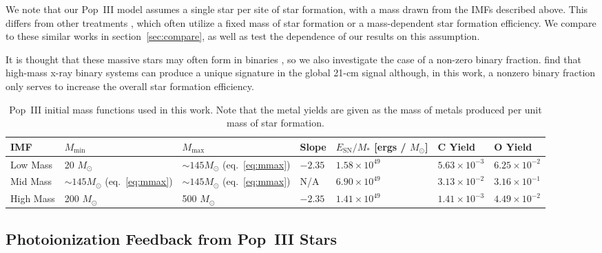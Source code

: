 \documentclass[a4paper,fleqn,usenatbib]{mnras}
\begin{document}
We note that our Pop~III model assumes a single star per site of star formation, with a mass drawn from the IMFs described above. This differs from other treatments \citep[e.g.,][]{jaacks_2017, visbal_2017}, which often utilize a fixed mass of star formation or a mass-dependent star formation efficiency. We compare to these similar works in section~\ref{sec:compare}, as well as test the dependence of our results on this assumption.

It is thought that these massive stars may often form in binaries \citep{turk_2009}, so we also investigate the case of a non-zero binary fraction. \citet{mirocha_2017} find that high-mass x-ray binary systems can produce a unique signature in the global 21-cm signal although, in this work, a nonzero binary fraction only serves to increase the overall star formation efficiency.

\begin{table*}
 \caption{Pop~III initial mass functions used in this work. Note that the metal yields are given as the mass of metals produced per unit mass of star formation.}
 \label{tab:popIII}
 \begin{tabular}{lllllll}
  \hline
  IMF & $M_\text{min}$ & $M_\text{max}$ & Slope & $E_\text{SN} / M_\ast$ [ergs / $M_\odot$] & C Yield & O Yield\\
  \hline
  Low Mass & 20 $M_\odot$ & $\sim 145 M_\odot$ (eq.~\ref{eq:mmax}) & $-2.35$ & $1.58 \times 10^{49}$ & $5.63 \times 10^{-3}$ &$6.25 \times 10^{-2}$\\[2pt] %
  Mid Mass & $\sim 145 M_\odot$ (eq.~\ref{eq:mmax}) & $\sim 145 M_\odot$ (eq.~\ref{eq:mmax}) & N/A & $6.90 \times 10^{49}$ & $3.13 \times 10^{-2}$ & $3.16 \times 10^{-1}$\\[2pt]
  High Mass & 200 $M_\odot$ & 500 $M_\odot$ & $-2.35$ & $1.41 \times 10^{49}$ & $1.41 \times 10^{-3}$ & $4.49 \times 10^{-2}$\\[2pt]
  \hline
 \end{tabular}
\end{table*}

\subsection{Photoionization Feedback from Pop~III Stars}
\label{sec:ion}
\end{document}
